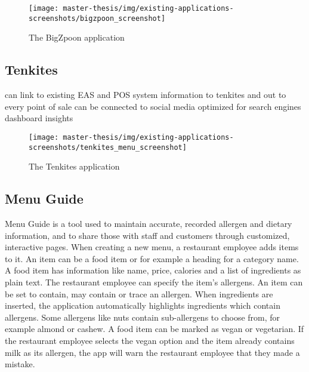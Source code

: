   \begin{figure}[h]
    \centering
    \texttt{[image: master-thesis/img/existing-applications-screenshots/bigzpoon\_screenshot]}
    \caption{The BigZpoon application}
  \end{figure}

\newpage

\subsection*{Tenkites}
  can link to existing EAS and POS system
  information to tenkites and out to every point of sale
  can be connected to social media
  optimized for search engines
  dashboard insights

  \begin{figure}[h]
    \centering
    \texttt{[image: master-thesis/img/existing-applications-screenshots/tenkites\_menu\_screenshot]}
    \caption{The Tenkites application}
  \end{figure}

\subsection*{Menu Guide}
  Menu Guide is a tool used to maintain accurate, recorded allergen and dietary information, and to share those with staff and customers through customized, interactive pages.
  When creating a new menu, a restaurant employee adds items to it. 
  An item can be a food item or for example a heading for a category name.
  A food item has information like name, price, calories and a list of ingredients as plain text.
  The restaurant employee can specify the item's allergens.
  An item can be set to contain, may contain or trace an allergen.
  When ingredients are inserted, the application automatically highlights ingredients which contain allergens.
  Some allergens like nuts contain sub-allergens to choose from, for example almond or cashew.
  A food item can be marked as vegan or vegetarian.
  If the restaurant employee selects the vegan option and the item already contains milk as its allergen, the app will warn the restaurant employee that they made a mistake.
  
